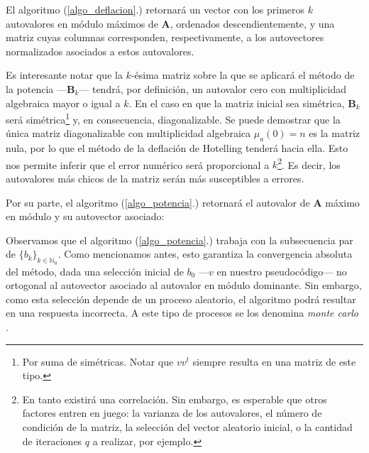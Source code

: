 \vspace{1em}


El algoritmo (\ref{algo_deflacion}.) retornará un vector con los primeros $k$ autovalores en módulo máximos de \textbf{A}, ordenados descendientemente, y una matriz cuyas columnas corresponden, respectivamente, a los autovectores normalizados asociados a estos autovalores. 

\vspace{1em}
Es interesante notar que la $k$-ésima matriz sobre la que se aplicará el método de la potencia ---\textbf{B}$_k$--- tendrá, por definición, un autovalor cero con multiplicidad algebraica mayor o igual a $k$. En el caso en que la matriz inicial sea simétrica, \textbf{B}$_k$ será simétrica\footnote{Por suma de simétricas. Notar que $v v^t$ siempre resulta en una matriz de este tipo.} y, en consecuencia, diagonalizable. Se puede demostrar que la única matriz diagonalizable con multiplicidad algebraica $\mu_{a}(0) = n$ es la matriz nula, por lo que el método de la deflación de Hotelling tenderá hacia ella. Esto nos permite inferir que el error numérico será proporcional a $k$\footnote{En tanto existirá una correlación. Sin embargo, es esperable que otros factores entren en juego: la varianza de los autovalores, el número de condición de la matriz, la selección del vector aleatorio inicial, o la cantidad de iteraciones $q$ a realizar, por ejemplo.}. Es decir, los autovalores más chicos de la matriz serán más susceptibles a errores.  


\vspace{2em}
\noindent Por su parte, el algoritmo (\ref{algo_potencia}.) retornará el autovalor de \textbf{A} máximo en módulo y su autovector asociado:

\vspace{1em}


\vspace{1em}
Observamos que el algoritmo (\ref{algo_potencia}.) trabaja con la subsecuencia par de $\{b_k\}_{k \in \mathbb{N}_0}$. Como mencionamos antes, esto garantiza la convergencia absoluta del método, dada una selección inicial de $b_0$ ---$v$ en nuestro pseudocódigo--- no ortogonal al autovector asociado al autovalor en módulo dominante. Sin embargo, como esta selección depende de un proceso aleatorio, el algoritmo podrá resultar en una respuesta incorrecta. A este tipo de procesos se los denomina \textit{monte carlo} \cite{Brassard}. 

